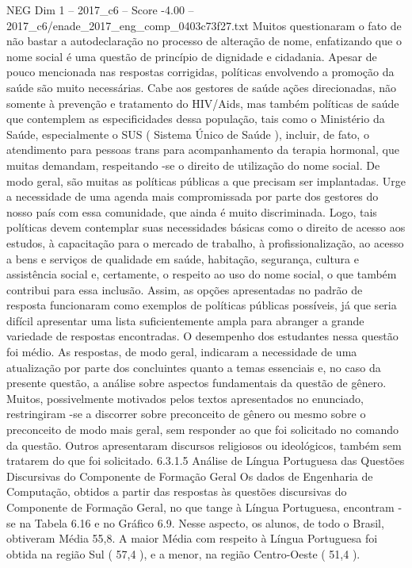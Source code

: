 \begin{textsample}{NEG Dim 1 – 2017\_c6 – Score -4.00 – 2017\_c6/enade\_2017\_eng\_comp\_0403c73f27.txt}
Muitos questionaram o fato de não bastar a autodeclaração no processo de alteração de nome, enfatizando que o nome social é uma questão de princípio de dignidade e cidadania.
Apesar de pouco mencionada nas respostas corrigidas, políticas envolvendo a promoção da saúde são muito necessárias.
Cabe aos gestores de saúde ações direcionadas, não somente à prevenção e tratamento do HIV/Aids, mas também políticas de saúde que contemplem as especificidades dessa população, tais como o Ministério da Saúde, especialmente o SUS ( Sistema Único de Saúde ), incluir, de fato, o atendimento para pessoas trans para acompanhamento da terapia hormonal, que muitas demandam, respeitando -se o direito de utilização do nome social.
De modo geral, são muitas as políticas públicas a que precisam ser implantadas.
Urge a necessidade de uma agenda mais compromissada por parte dos gestores do nosso país com essa comunidade, que ainda é muito discriminada.
Logo, tais políticas devem contemplar suas necessidades básicas como o direito de acesso aos estudos, à capacitação para o mercado de trabalho, à profissionalização, ao acesso a bens e serviços de qualidade em saúde, habitação, segurança, cultura e assistência social e, certamente, o respeito ao uso do nome social, o que também contribui para essa inclusão.
Assim, as opções apresentadas no padrão de resposta funcionaram como exemplos de políticas públicas possíveis, já que seria difícil apresentar uma lista suficientemente ampla para abranger a grande variedade de respostas encontradas.
O desempenho dos estudantes nessa questão foi médio.
As respostas, de modo geral, indicaram a necessidade de uma atualização por parte dos concluintes quanto a temas essenciais e, no caso da presente questão, a análise sobre aspectos fundamentais da questão de gênero.
Muitos, possivelmente motivados pelos textos apresentados no enunciado, restringiram -se a discorrer sobre preconceito de gênero ou mesmo sobre o preconceito de modo mais geral, sem responder ao que foi solicitado no comando da questão.
Outros apresentaram discursos religiosos ou ideológicos, também sem tratarem do que foi solicitado. 6.3.1.5 Análise de Língua Portuguesa das Questões Discursivas do Componente de Formação Geral Os dados de Engenharia de Computação, obtidos a partir das respostas às questões discursivas do Componente de Formação Geral, no que tange à Língua Portuguesa, encontram -se na Tabela 6.16 e no Gráfico 6.9.
Nesse aspecto, os alunos, de todo o Brasil, obtiveram Média 55,8.
A maior Média com respeito à Língua Portuguesa foi obtida na região Sul ( 57,4 ), e a menor, na região Centro-Oeste ( 51,4 ).

\end{textsample}
